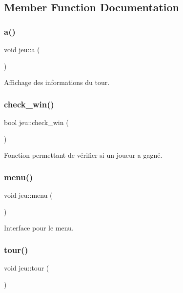 \subsection{Member Function Documentation}
\mbox{\label{classjeu_a044947660d0990bd6869d3669306ba8c}} 
\subsubsection{\texorpdfstring{a()}{a()}}
{\footnotesize\ttfamily void jeu\+::a (\begin{DoxyParamCaption}{ }\end{DoxyParamCaption})}



Affichage des informations du tour. 

\mbox{\label{classjeu_a7da98d2c8eaccacc01abb6d25777a7a0}} 
\subsubsection{\texorpdfstring{check\+\_\+win()}{check\_win()}}
{\footnotesize\ttfamily bool jeu\+::check\+\_\+win (\begin{DoxyParamCaption}{ }\end{DoxyParamCaption})}



Fonction permettant de vérifier si un joueur a gagné. 

\mbox{\label{classjeu_a5b18141ecb3ed6cad4e8116e8248b461}} 
\subsubsection{\texorpdfstring{menu()}{menu()}}
{\footnotesize\ttfamily void jeu\+::menu (\begin{DoxyParamCaption}{ }\end{DoxyParamCaption})}



Interface pour le menu. 

\mbox{\label{classjeu_ac71ae1e00668be38e0e9b1e2f890639d}} 
\subsubsection{\texorpdfstring{tour()}{tour()}}
{\footnotesize\ttfamily void jeu\+::tour (\begin{DoxyParamCaption}{ }\end{DoxyParamCaption})}



